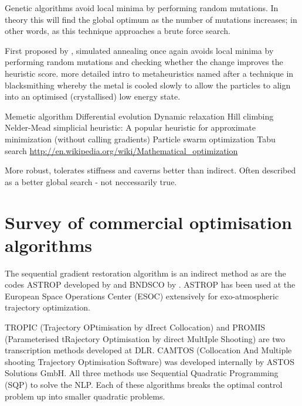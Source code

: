 Genetic algorithms avoid local minima by performing random mutations. In theory this will find the global optimum as the number of mutations increases; in other words, as this technique approaches a brute force search.

First proposed by \textcite{Kirkpatrick1983}, simulated annealing once again avoids local minima by performing random mutations and checking whether the change improves the heuristic score.
\textcite{Dreo2006} more detailed intro to metaheuristics
named after a technique in blacksmithing whereby the metal is cooled slowly to allow the particles to align into an optimised (crystallised) low energy state.

Memetic algorithm
Differential evolution
Dynamic relaxation
Hill climbing
Nelder-Mead simplicial heuristic: A popular heuristic for approximate minimization (without calling gradients)
Particle swarm optimization
Tabu search
\url{http://en.wikipedia.org/wiki/Mathematical_optimization}

More robust, tolerates stiffness and caverns better than indirect. Often described as a better global search - not neccessarily true.

\section{Survey of commercial optimisation algorithms} \label{sec:Algorithms}

The sequential gradient restoration algorithm \parencite[SGRA, ][]{Miele1975} is an indirect method as are the codes ASTROP developed by \textcite{Bartholomew-Biggs1988} and BNDSCO by \textcite{Bulirsch1971}. ASTROP has been used at the European Space Operations Center (ESOC) extensively for exo-atmospheric trajectory optimization. 


TROPIC (Trajectory OPtimisation by dIrect Collocation) and PROMIS (Parameterised tRajectory Optimisation by direct MultIple Shooting) are two transcription methods developed at DLR. CAMTOS (Collocation And Multiple shooting Trajectory Optimisation Software) was developed internally by ASTOS Solutions GmbH. All three methods use Sequential Quadratic Programming (SQP) to solve the NLP. Each of these algorithms breaks the optimal control problem up into smaller quadratic problems. 

